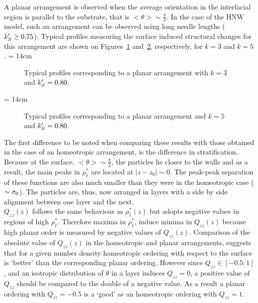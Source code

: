 A planar arrangement is observed when the average orientation in the interfacial region is 
parallel to the substrate, that is $<\theta> \sim \frac{\pi}{2}$. In the case of the HNW
model, such an arrangement can be observed using long needle lengths 
($k_S^{\prime} \geq 0.75$). Typical profiles measuring the surface induced structural changes 
for this arrangement  are shown on Figures~\ref{fig:typicalProfile_k3_planar} 
and~\ref{fig:typicalProfile_k5_planar}, respectively, for $k=3$ and $k=5$.
%
\picW = 14cm
\begin{figure}
        \centering
	\caption{Typical profiles corresponding to a planar arrangement with $k=3$ and $k_S^{\prime} =
	0.80$.}
	\label{fig:typicalProfile_k3_planar}
\end{figure}

\picW = 14cm
\begin{figure}
        \centering
	\caption{Typical profiles corresponding to a planar arrangement and $k=5$ and $k_S^{\prime} =
	0.80$.}
	\label{fig:typicalProfile_k5_planar}
\end{figure}

The first difference to be noted when comparing these results with those obtained in the case
of an homeotropic arrangement, is the difference in stratification.
%
Because at the surface,
$<\theta>\sim\frac{\pi}{2}$, the particles lie closer to the walls and as 
a result, the main peaks in $\rho^{*}_\ell$ are located at $|z-z_0|\sim 0$. The peak-peak
separation of these
functions are also much smaller than they were in the homeotropic case ($\sim\sigma_0$). 
The particles are, thus, now arranged in layers with a side by side alignment between one layer 
and the next.\\

$Q_{zz}(z)$ follows the same behaviour as $\rho^{*}_\ell(z)$ but adopts negative values in regions 
of high $\rho^{*}_\ell$. Therefore  maxima in $\rho^{*}_\ell$, induce minima in $Q_{zz}(z)$
because high planar order is measured by negative values of $Q_{zz}(z)$.
%
Comparison of the absolute value of $Q_{zz}(z)$ in the homeotropic and planar
arrangements, suggests that for a given number density homeotropic ordering with respect 
to the surface is `better' than the corresponding planar ordering. However 
since $Q_{zz} \in[-0.5:1]$, and an isotropic distribution of $\theta$ in a layer induces $Q_{zz}=0$, a
positive value of $Q_{zz}$ should be compared to the double of a negative value. As a result a
planar ordering with $Q_{zz}= -0.5$ is a `good' as an homeotropic ordering with $Q_{zz} = 1$.\\

